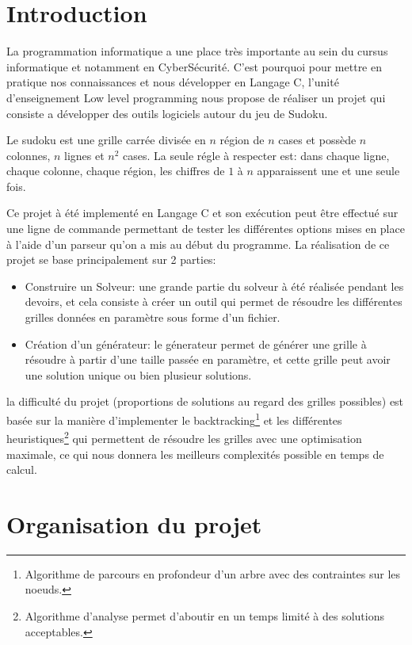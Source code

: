 \documentclass[12pt]{article}
\begin{document}
	\section{Introduction}
	La programmation informatique a une place très importante au sein du cursus informatique et notamment en CyberSécurité. C'est pourquoi pour mettre en pratique nos connaissances et nous développer en Langage C, l'unité d'enseignement Low level programming nous propose de réaliser un projet qui consiste a développer des outils logiciels autour du jeu de Sudoku.
	\par Le sudoku est une grille carrée divisée en $n$ région de $n$ cases et possède $n$ colonnes, $n$ lignes et $n^2$ cases. La seule régle à respecter est: dans chaque ligne, chaque colonne, chaque région, les chiffres de $1$ à $n$ apparaissent une et une seule fois.
	\par Ce projet à été implementé en Langage C et son exécution peut être effectué sur une ligne de commande permettant de tester les différentes options mises en place à l'aide d'un parseur qu'on a mis au début du programme. La réalisation de ce projet se base principalement sur 2 parties:
	\begin{itemize}
		\item Construire un Solveur: une grande partie du solveur à été réalisée pendant les devoirs, et cela consiste à créer un outil qui permet de résoudre les différentes grilles données en paramètre sous forme d'un fichier.
		\item Création d'un générateur: le génerateur permet de générer une grille à résoudre à partir d'une taille passée en paramètre, et cette grille peut avoir une solution unique ou bien plusieur solutions.
	\end{itemize}
    la difficulté du projet (proportions de solutions au regard des grilles possibles) est basée sur la manière d'implementer le backtracking\footnote{Algorithme de parcours en profondeur d'un arbre avec des contraintes sur les noeuds.} et les différentes heuristiques\footnote{Algorithme d'analyse permet d'aboutir en un temps limité à des solutions acceptables.} qui permettent de résoudre les grilles avec une optimisation maximale, ce qui nous donnera les meilleurs complexités possible en temps de calcul.
	\newpage

    \section{Organisation du projet}
\end{document}
